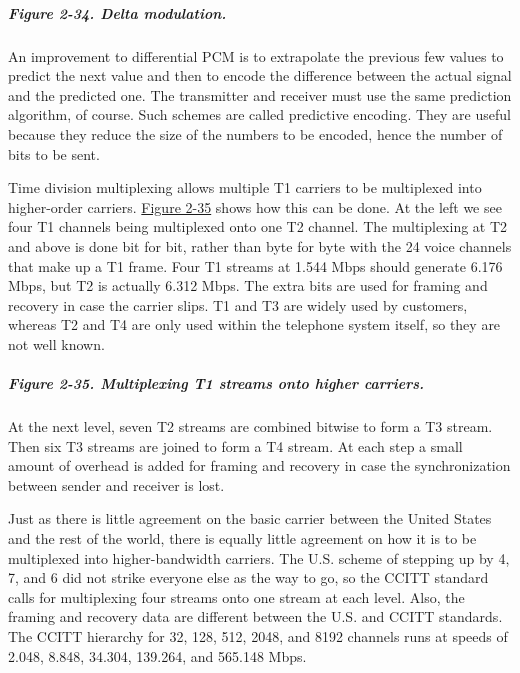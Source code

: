 \subparagraph[Figure 2-34. Delta
modulation.]{\texorpdfstring{\protect\hypertarget{0130661023_ch02lev1sec5.htmlux5cux23ch02fig34}{}{}Figure
2-34. Delta modulation.}{Figure 2-34. Delta modulation.}}


An improvement to differential PCM is to extrapolate the previous few
values to predict the next value and then to encode the difference
between the actual signal and the predicted one. The transmitter and
receiver must use the same prediction algorithm, of course. Such schemes
are called {predictive encoding}. They are useful because they reduce
the size of the numbers to be encoded, hence the number of bits to be
sent.

Time division multiplexing allows multiple T1 carriers to be multiplexed
into higher-order carriers.
\protect\hyperlink{0130661023_ch02lev1sec5.htmlux5cux23ch02fig35}{Figure
2-35} shows how this can be done. At the left we see four T1 channels
being multiplexed onto one T2 channel. The multiplexing at T2 and above
is done bit for bit, rather than byte for byte with the 24 voice
channels that make up a T1 frame. Four T1 streams at 1.544 Mbps should
generate 6.176 Mbps, but T2 is actually 6.312 Mbps. The extra bits are
used for framing and recovery in case the carrier slips. T1 and T3 are
widely used by customers, whereas T2 and T4 are only used within the
telephone system itself, so they are not well known.

\subparagraph[Figure 2-35. Multiplexing T1 streams onto higher
carriers.]{\texorpdfstring{\protect\hypertarget{0130661023_ch02lev1sec5.htmlux5cux23ch02fig35}{}{}Figure
2-35. Multiplexing T1 streams onto higher
carriers.}{Figure 2-35. Multiplexing T1 streams onto higher carriers.}}


At the next level, seven T2 streams are combined bitwise to form a T3
stream. Then six T3 streams are joined to form a T4 stream. At each step
a small amount of overhead is added for framing and recovery in case the
synchronization between sender and receiver is lost.

Just as there is little agreement on the basic carrier between the
United States and the rest of the world, there is equally little
agreement on how it is to be multiplexed into higher-bandwidth carriers.
The U.S. scheme of stepping up by 4, 7, and 6 did not strike everyone
else as the way to go, so the CCITT standard calls for multiplexing four
streams onto one stream at each level. Also, the framing and recovery
data are different between the U.S. and CCITT standards. The CCITT
hierarchy for 32, 128, 512, 2048, and 8192 channels runs at speeds of
2.048, 8.848, 34.304, 139.264, and 565.148 Mbps.

